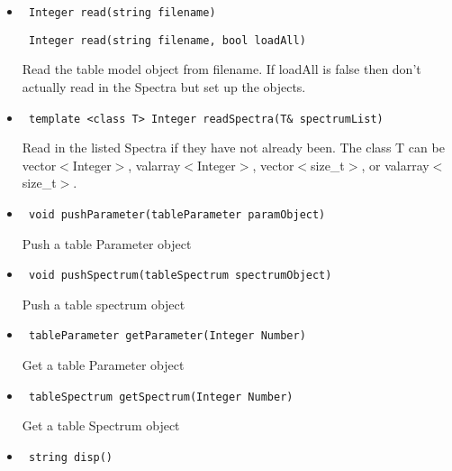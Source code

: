 \documentclass[11pt]{book}
\begin{document}
\begin{itemize}

\item    \begin{verbatim} Integer read(string filename) \end{verbatim}
         \begin{verbatim} Integer read(string filename, bool loadAll) \end{verbatim}
            
            Read the table model object from filename. If loadAll is 
            false then don't actually read in the Spectra but set up
            the objects.

\item    \begin{verbatim} template <class T> Integer readSpectra(T& spectrumList)\end{verbatim}

            Read in the listed Spectra if they have not already been.
            The class T can be vector$<$Integer$>$, valarray$<$Integer$>$,
            vector$<$size\_t$>$, or valarray$<$size\_t$>$.

\item    \begin{verbatim} void pushParameter(tableParameter paramObject) \end{verbatim}
            
            Push a table Parameter object

\item    \begin{verbatim} void pushSpectrum(tableSpectrum spectrumObject) \end{verbatim}
            
            Push a table spectrum object

\item    \begin{verbatim} tableParameter getParameter(Integer Number) \end{verbatim}
            
            Get a table Parameter object

\item    \begin{verbatim} tableSpectrum getSpectrum(Integer Number) \end{verbatim}
            
            Get a table Spectrum object

\item    \begin{verbatim} string disp() \end{verbatim}


\end{itemize}
\end{document}

